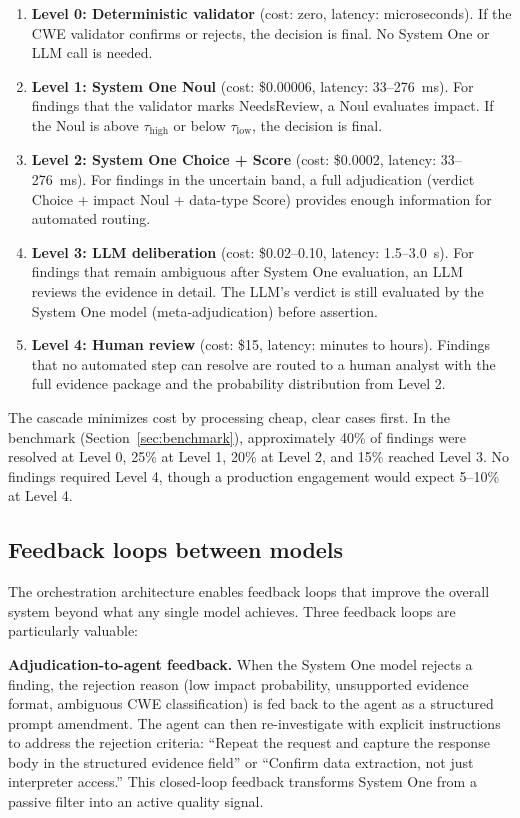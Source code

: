 \documentclass[conference]{IEEEtran}
\begin{document}
\begin{enumerate}[leftmargin=*]
\item \textbf{Level 0: Deterministic validator} (cost: zero, latency: microseconds). If the CWE validator confirms or rejects, the decision is final. No System One or LLM call is needed.
\item \textbf{Level 1: System One Noul} (cost: \$0.00006, latency: 33--276~ms). For findings that the validator marks NeedsReview, a Noul evaluates impact. If the Noul is above $\tau_{\text{high}}$ or below $\tau_{\text{low}}$, the decision is final.
\item \textbf{Level 2: System One Choice + Score} (cost: \$0.0002, latency: 33--276~ms). For findings in the uncertain band, a full adjudication (verdict Choice + impact Noul + data-type Score) provides enough information for automated routing.
\item \textbf{Level 3: LLM deliberation} (cost: \$0.02--0.10, latency: 1.5--3.0~s). For findings that remain ambiguous after System One evaluation, an LLM reviews the evidence in detail. The LLM's verdict is still evaluated by the System One model (meta-adjudication) before assertion.
\item \textbf{Level 4: Human review} (cost: \$15, latency: minutes to hours). Findings that no automated step can resolve are routed to a human analyst with the full evidence package and the probability distribution from Level 2.
\end{enumerate}

The cascade minimizes cost by processing cheap, clear cases first. In the benchmark (Section~\ref{sec:benchmark}), approximately 40\% of findings were resolved at Level 0, 25\% at Level 1, 20\% at Level 2, and 15\% reached Level 3. No findings required Level 4, though a production engagement would expect 5--10\% at Level 4.

\subsection{Feedback loops between models}

The orchestration architecture enables feedback loops that improve the overall system beyond what any single model achieves. Three feedback loops are particularly valuable:

\textbf{Adjudication-to-agent feedback.} When the System One model rejects a finding, the rejection reason (low impact probability, unsupported evidence format, ambiguous CWE classification) is fed back to the agent as a structured prompt amendment. The agent can then re-investigate with explicit instructions to address the rejection criteria: ``Repeat the request and capture the response body in the structured evidence field'' or ``Confirm data extraction, not just interpreter access.'' This closed-loop feedback transforms System One from a passive filter into an active quality signal.
\end{document}

